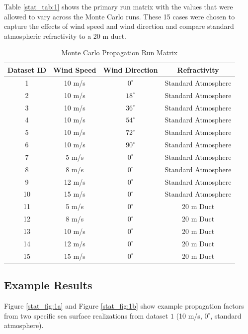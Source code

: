 Table \ref{stat_tab:1} shows the primary run matrix with the values that were allowed to vary across the Monte Carlo runs. These 15 cases were chosen to capture the effects of wind speed and wind direction and compare standard atmospheric refractivity to a 20 m duct.
\begin{table}[H]
  \begin{center}
      \renewcommand{\baselinestretch}{1} \small\normalsize
  \begin{quote}
    \caption[Monte Carlo Propagation Run Matrix]{Monte Carlo Propagation Run Matrix\label{stat_tab:0}}
  \end{quote}
  \begin{tabular} {|c | c | c| c |}
    \hline
  \bf{Dataset ID} & \bf{Wind Speed} & \bf{Wind Direction} & \bf{Refractivity}  \\ \hline
  1 & 10 m/s & $0^{\circ}$ & Standard Atmosphere \\ \hline
  2 & 10 m/s & $18^{\circ}$ & Standard Atmosphere \\ \hline
  3 & 10 m/s & $36^{\circ}$ & Standard Atmosphere \\ \hline
  4 & 10 m/s & $54^{\circ}$ & Standard Atmosphere \\ \hline
  5 & 10 m/s & $72^{\circ}$ & Standard Atmosphere \\ \hline
  6 & 10 m/s & $90^{\circ}$ & Standard Atmosphere \\ \hline
  7 & 5 m/s & $0^{\circ}$ & Standard Atmosphere \\ \hline
  8 & 8 m/s & $0^{\circ}$ & Standard Atmosphere \\ \hline
  9 & 12 m/s & $0^{\circ}$ & Standard Atmosphere \\ \hline
  10 & 15 m/s & $0^{\circ}$ & Standard Atmosphere \\ \hline
  11 & 5 m/s & $0^{\circ}$ & 20 m Duct\\ \hline
  12 & 8 m/s & $0^{\circ}$ & 20 m Duct \\ \hline
  13 & 10 m/s & $0^{\circ}$ & 20 m Duct \\ \hline
  14 & 12 m/s & $0^{\circ}$ & 20 m Duct \\ \hline
  15 & 15 m/s & $0^{\circ}$ & 20 m Duct \\ \hline
\end{tabular}
\end{center}
\end{table}
\renewcommand{\baselinestretch}{2} \small\normalsize


\subsection{Example Results}
Figure \ref{stat_fig:1a} and Figure \ref{stat_fig:1b} show example propagation factors from two specific sea surface realizations from dataset $1$ (10 m/s, $0^{\circ}$, standard atmosphere).

